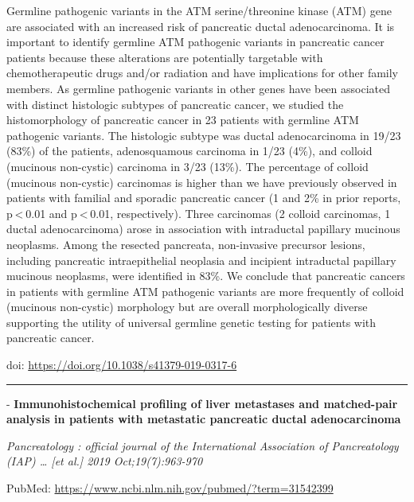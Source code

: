 \documentclass[
]{article}
\renewcommand{\linethickness}{0.05em}
\begin{document}
Germline pathogenic variants in the ATM serine/threonine kinase (ATM)
gene are associated with an increased risk of pancreatic ductal
adenocarcinoma. It is important to identify germline ATM pathogenic
variants in pancreatic cancer patients because these alterations are
potentially targetable with chemotherapeutic drugs and/or radiation and
have implications for other family members. As germline pathogenic
variants in other genes have been associated with distinct histologic
subtypes of pancreatic cancer, we studied the histomorphology of
pancreatic cancer in 23 patients with germline ATM pathogenic variants.
The histologic subtype was ductal adenocarcinoma in 19/23 (83\%) of the
patients, adenosquamous carcinoma in 1/23 (4\%), and colloid (mucinous
non-cystic) carcinoma in 3/23 (13\%). The percentage of colloid
(mucinous non-cystic) carcinomas is higher than we have previously
observed in patients with familial and sporadic pancreatic cancer (1 and
2\% in prior reports, p \textless{} 0.01 and p \textless{} 0.01,
respectively). Three carcinomas (2 colloid carcinomas, 1 ductal
adenocarcinoma) arose in association with intraductal papillary mucinous
neoplasms. Among the resected pancreata, non-invasive precursor lesions,
including pancreatic intraepithelial neoplasia and incipient intraductal
papillary mucinous neoplasms, were identified in 83\%. We conclude that
pancreatic cancers in patients with germline ATM pathogenic variants are
more frequently of colloid (mucinous non-cystic) morphology but are
overall morphologically diverse supporting the utility of universal
germline genetic testing for patients with pancreatic cancer.

doi: \url{https://doi.org/10.1038/s41379-019-0317-6}

\begin{center}\rule{0.5\linewidth}{\linethickness}\end{center}

- \textbf{Immunohistochemical profiling of liver metastases and
matched-pair analysis in patients with metastatic pancreatic ductal
adenocarcinoma}

\emph{Pancreatology : official journal of the International Association
of Pancreatology (IAP) \ldots{} {[}et al.{]} 2019 Oct;19(7):963-970}

PubMed: \url{https://www.ncbi.nlm.nih.gov/pubmed/?term=31542399}
\end{document}
